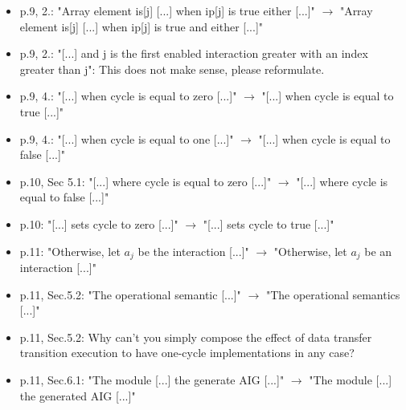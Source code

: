 \begin{itemize}
\item p.9, 2.: "Array element is[j] [...] when ip[j] is true either [...]" $\rightarrow$ 
"Array element is[j] [...] when ip[j] is true and either [...]"
\done
\item p.9, 2.: "[...] and j is the first enabled interaction greater with an 
index greater than j": This does not make sense, please reformulate.
\done
\item p.9, 4.: "[...] when cycle is equal to zero [...]" $\rightarrow$ "[...] when cycle is 
equal to true [...]"
\done
\item p.9, 4.: "[...] when cycle is equal to one [...]" $\rightarrow$ "[...] when cycle is 
equal to false [...]"
\done
\item p.10, Sec 5.1: "[...] where cycle is equal to zero [...]" $\rightarrow$ "[...] where 
cycle is equal to false [...]"
\done
\item p.10: "[...] sets cycle to zero [...]" $\rightarrow$ "[...] sets cycle to true [...]"
\done
\item p.11: "Otherwise, let $a_j$ be the interaction [...]" $\rightarrow$ "Otherwise, let $a_j$ 
be an interaction [...]"
\done
\item p.11, Sec.5.2: "The operational semantic [...]" $\rightarrow$ "The operational 
semantics [...]"
\done
\item p.11, Sec.5.2: Why can't you simply compose the effect of data transfer 
transition execution to have one-cycle implementations in any case?
\item p.11, Sec.6.1: "The module [...] the generate AIG [...]" $\rightarrow$ "The module 
[...] the generated AIG [...]"
\done
\end{itemize}
